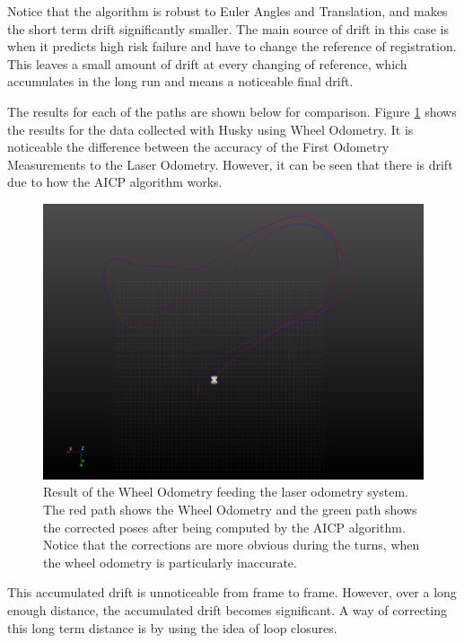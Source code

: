 \documentclass[12pt]{article}
\begin{document}
Notice that the algorithm is robust to Euler Angles and Translation, and makes the short term drift significantly smaller. The main source of drift in this case is when it predicts high risk failure and have to change the reference of registration. This leaves a small amount of drift at every changing of reference, which accumulates in the long run and means a noticeable final drift.
	
The results for each of the paths are shown below for comparison. Figure \ref{fig:LaserOdometry1} shows the results for the data collected with Husky using Wheel Odometry. It is noticeable the difference between the accuracy of the First Odometry Measurements to the Laser Odometry. However, it can be seen that there is drift due to how the AICP algorithm works.

\begin{figure}
\begin{minipage}{0.65\textwidth}
\centering
\includegraphics[width=\textwidth]{LaserOdometry1}
\end{minipage} \hfill
\begin{minipage}{0.35\textwidth}
\centering
\caption[t]{Result of the Wheel Odometry feeding the laser odometry system. The red path shows the Wheel Odometry and the green path shows the corrected poses after being computed by the AICP algorithm. Notice that the corrections are more obvious during the turns, when the wheel odometry is particularly inaccurate.}
\label{fig:LaserOdometry1}	
\end{minipage}				
\end{figure}

This accumulated drift is unnoticeable from frame to frame. However, over a long enough distance, the accumulated drift becomes significant. A way of correcting this long term distance is by using the idea of loop closures.
	
\end{document}
